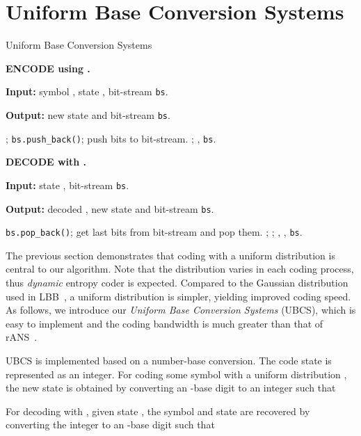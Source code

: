 \documentclass{article}
\begin{document}
\section{Uniform Base Conversion Systems}
\label{sec:uans}

\begin{algorithm}[h]
\small
\caption{Uniform Base Conversion Systems}
\begin{multicols}{2} 
\textbf{ENCODE  using .} 

\textbf{Input:} symbol , state , bit-stream \texttt{bs}.

\textbf{Output:} new state  and bit-stream \texttt{bs}.

\begin{algorithmic}[1]
\STATE ;
\IF {}
\STATE \texttt{bs.push\_back()}; \quad  push  bits to bit-stream.
\STATE ;
\ENDIF
\RETURN , \texttt{bs}.
\end{algorithmic}

\textbf{DECODE with .} 

\textbf{Input:} state , bit-stream \texttt{bs}.

\textbf{Output:} decoded , new state  and bit-stream \texttt{bs}.

\begin{algorithmic}[1]
\IF {}
\STATE \texttt{bs.pop\_back()}; \quad  get last  bits from bit-stream and pop them.
\ENDIF
\STATE ;
\STATE ;
\RETURN , , \texttt{bs}.
\end{algorithmic}
\end{multicols}
\vspace{-8pt}
\label{alg:uans}
\end{algorithm}

The previous section demonstrates that coding with a uniform distribution is central to our algorithm. Note that the distribution varies in each coding process, thus {\em dynamic} entropy coder is expected. Compared to the Gaussian distribution used in LBB~\cite{ho2019compression}, a uniform distribution is simpler, yielding improved coding speed. As follows, we introduce our \textit{Uniform Base Conversion Systems} (UBCS), which is easy to implement and the coding bandwidth is much greater than that of rANS~\cite{duda2013asymmetric}.

UBCS is implemented based on a number-base conversion. The code state  is represented as an integer.
For coding some symbol  with a uniform distribution , the new state  is obtained by converting an -base digit  to an integer such that 

For decoding with , given state , the symbol  and state  are recovered by converting the integer to an -base digit such that 
\end{document}
